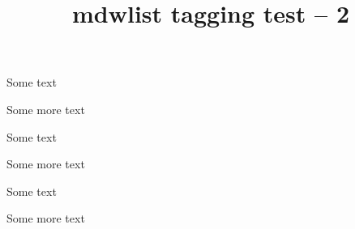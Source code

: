\documentclass{article}
\title{mdwlist tagging test -- 2}
\begin{document}
\begin{enumerate*}
\item Some text
\item Some more text
\end{enumerate*}
\begin{itemize*}
\item Some text
\item Some more text
\end{itemize*}
\begin{description*}
\item[a label] Some text
\item[another label] Some more text
\end{description*}
\end{document}

